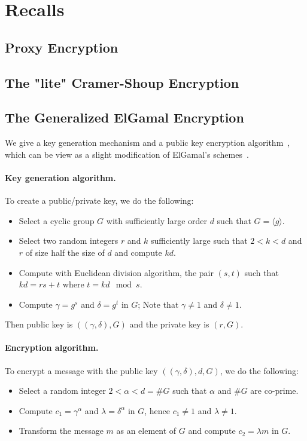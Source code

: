 \documentclass[a4paper,11pt]{article}
\begin{document}
\section{Recalls}\label{sec:two}

\subsection{Proxy Encryption}\label{sec:two:1}

\subsection{The "lite" Cramer-Shoup Encryption}\label{sec:two:2}

\subsection{The Generalized ElGamal Encryption}\label{sec:two:2}
We give a key generation mechanism and a public key encryption
algorithm~\cite{sow}, which can be view as a slight modification of
ElGamal's schemes~\cite{Elgamal}.

\paragraph{Key generation algorithm.}
    To create a public/private key, we do the following:
\begin{itemize}
    \item Select a cyclic group $G$ with sufficiently large order $d$ such that $G=\langle g \rangle$.

    \item Select two random integers $r$ and $k$ sufficiently large
      such that $ 2 < k < d$ and $r$ of size half the size of $d$ and compute $kd$.
    \item Compute with Euclidean division algorithm, the pair $(s,t)$
      such that $kd= rs+t$ where $t = kd \mod s$.

    \item  Compute $\gamma = g^{s} $ and $\delta = g^{t} $ in $G$; Note that $\gamma \neq 1$ and $\delta \neq 1$.
\end{itemize}
Then public key is $((\gamma, \delta), G)$ and the private key is $( r, G)$.

\paragraph{Encryption algorithm.}
    To encrypt a message with the public key $((\gamma, \delta), d,
    G)$, we do the following:
\begin{itemize}
    \item Select a random integer $2<\alpha< d=\#G$ such that $\alpha$
      and $\#G$ are co-prime.
    \item Compute $ c_{1}=\gamma^{\alpha} $ and
      $\lambda=\delta^{\alpha}$ in $G$, hence $ c_{1}\neq 1$ and $
      \lambda \neq 1$.
    \item Transform the message $m$ as an element of $G$ and compute
      $c_{2}=\lambda m$ in $G$.
\end{itemize}
\end{document}
